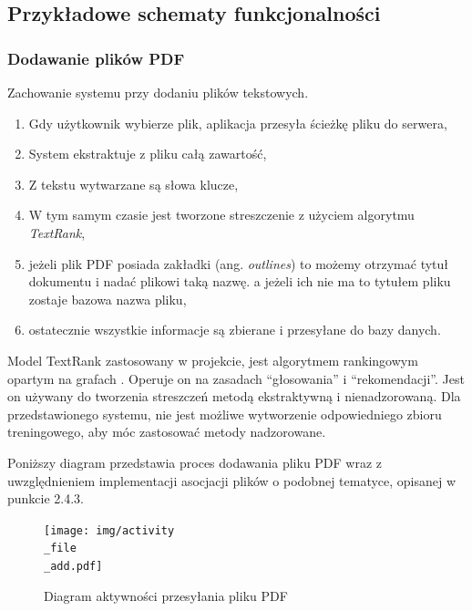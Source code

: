 \documentclass[12pt,a4paper,twoside]{article}
\begin{document}
\subsection{Przykładowe schematy funkcjonalności}
\subsubsection*{Dodawanie plików PDF}
Zachowanie systemu przy dodaniu plików tekstowych.
\begin{enumerate}
	\item Gdy użytkownik wybierze plik, aplikacja przesyła ścieżkę pliku do serwera,
	\item System ekstraktuje z pliku całą zawartość,
	\item Z tekstu wytwarzane są słowa klucze, 
	\item W tym samym czasie jest tworzone streszczenie z użyciem algorytmu \textit{TextRank},
	\item jeżeli plik PDF posiada zakładki (ang. \textit{outlines}) to możemy otrzymać tytuł dokumentu i nadać plikowi taką nazwę. a jeżeli ich nie ma to tytułem pliku zostaje bazowa nazwa pliku,
	\item ostatecznie wszystkie informacje są zbierane i przesyłane do bazy danych.
\end{enumerate}
Model TextRank zastosowany w projekcie, jest algorytmem rankingowym opartym na grafach \cite{textrank}. Operuje on na zasadach ``głosowania'' i ``rekomendacji''. Jest on używany do tworzenia streszczeń metodą ekstraktywną i nienadzorowaną. Dla przedstawionego systemu, nie jest możliwe wytworzenie odpowiedniego zbioru treningowego, aby móc zastosować metody nadzorowane. \par
Poniższy diagram przedstawia proces dodawania pliku PDF wraz z uwzględnieniem implementacji asocjacji plików o podobnej tematyce, opisanej w punkcie 2.4.3.
\begin{figure}[h!]
\centering
  \texttt{[image: img/activity\\\_file\\\_add.pdf]}
  \caption{Diagram aktywności przesyłania pliku PDF}
\end{figure}
\clearpage
\newpage
\end{document}
